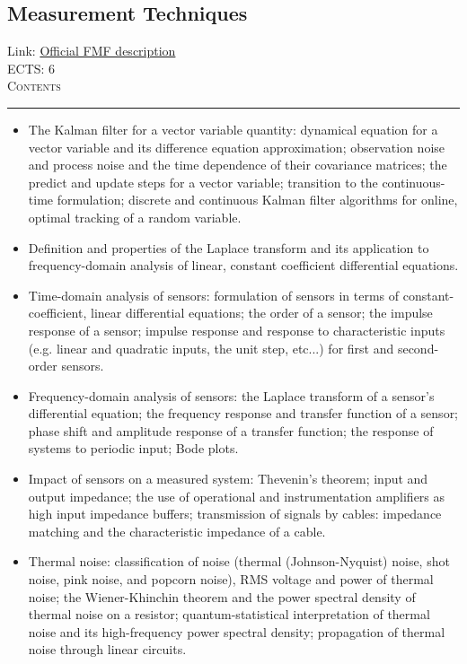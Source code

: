 \documentclass[11pt, a4paper]{article}
\newenvironment{course}[3]{
\subsection{#1}%
Link: \href{#2}{Official FMF description}\\%
ECTS: #3%
\vspace{1ex}
\\
{\large \textsc{Contents}}\\[-0.9ex]%
\rule{\textwidth}{0.5pt}
\vspace{-3ex}
}
{}
\newenvironment{chapter}[1]{
\begin{tcolorbox}[title=#1, breakable]
}
{\end{tcolorbox}}
\begin{document}
\begin{course}{Measurement Techniques}{https://www.fmf.uni-lj.si/en/study-physics/programmes/1fiz/2020/7000777/courses/1441/}{6}
\begin{chapter}{The Kalman filter}
\begin{itemize}
            \item The Kalman filter for a vector variable quantity: dynamical equation for a vector variable and its difference equation approximation; observation noise and process noise and the time dependence of their covariance matrices; the predict and update steps for a vector variable; transition to the continuous-time formulation; discrete and continuous Kalman filter algorithms for online, optimal tracking of a random variable. 
        
        \end{itemize}
    \end{chapter}

    \begin{chapter}{Analysis of sensors and filters}
        \begin{itemize}
        
            \item Definition and properties of the Laplace transform and its application to frequency-domain analysis of linear, constant coefficient differential equations.

            \item Time-domain analysis of sensors: formulation of sensors in terms of constant-coefficient, linear differential equations; the order of a sensor; the impulse response of a sensor; impulse response and response to characteristic inputs (e.g. linear and quadratic inputs, the unit step, etc...) for first and second-order sensors.

            \item Frequency-domain analysis of sensors: the Laplace transform of a sensor's differential equation; the frequency response and transfer function of a sensor; phase shift and amplitude response of a transfer function; the response of systems to periodic input; Bode plots.

            \item Impact of sensors on a measured system: Thevenin's theorem; input and output impedance; the use of operational and instrumentation amplifiers as high input impedance buffers; transmission of signals by cables: impedance matching and the characteristic impedance of a cable.

            \item Thermal noise: classification of noise (thermal (Johnson-Nyquist) noise, shot noise, pink noise, and popcorn noise), RMS voltage and power of thermal noise; the Wiener-Khinchin theorem and the power spectral density of thermal noise on a resistor; quantum-statistical interpretation of thermal noise and its high-frequency power spectral density; propagation of thermal noise through linear circuits.
        

\end{itemize}
\end{chapter}
\end{course}
\end{document}
